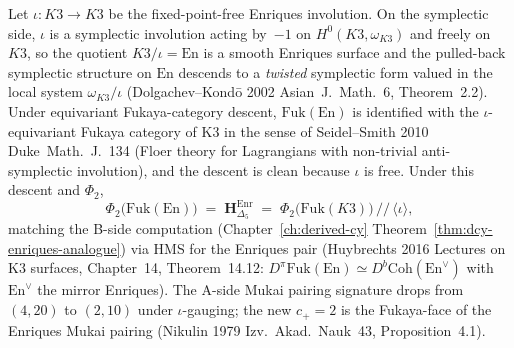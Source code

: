 \begin{remark}
\label{rem:fukaya-enriques}
Let $\iota\colon K3\to K3$ be the fixed-point-free Enriques
involution. On the symplectic side, $\iota$ is a symplectic
involution acting by~$-1$ on $H^0(K3,\omega_{K3})$ and freely on
$K3$, so the quotient $K3/\iota = \mathrm{En}$ is a smooth
Enriques surface and the pulled-back symplectic structure on
$\mathrm{En}$ descends to a \emph{twisted} symplectic form valued
in the local system $\omega_{K3}/\iota$ (Dolgachev--Kond\={o} 2002
\textup{Asian~J.~Math.}~6, Theorem~2.2). Under equivariant
Fukaya-category descent, $\mathrm{Fuk}(\mathrm{En})$ is identified
with the $\iota$-equivariant Fukaya category of K3 in the sense of
Seidel--Smith 2010
\textup{Duke~Math.~J.}~134 (Floer theory for Lagrangians with
non-trivial anti-symplectic involution), and the descent is clean
because $\iota$ is free. Under this descent and $\Phi_2$,
\[
 \Phi_2\bigl(\mathrm{Fuk}(\mathrm{En})\bigr)
 \;=\;
 \mathbf{H}_{\Delta_5}^{\mathrm{Enr}}
 \;=\;
 \Phi_2\bigl(\mathrm{Fuk}(K3)\bigr)\,/\!\!/\,\langle\iota\rangle,
\]
matching the B-side computation
(Chapter~\ref{ch:derived-cy}
Theorem~\ref{thm:dcy-enriques-analogue}) via HMS for the
Enriques pair (Huybrechts 2016 \textup{Lectures on K3 surfaces},
Chapter~14, Theorem~14.12: $D^\pi\mathrm{Fuk}(\mathrm{En})
\simeq D^b\mathrm{Coh}(\mathrm{En}^\vee)$ with
$\mathrm{En}^\vee$ the mirror Enriques). The A-side Mukai pairing
signature drops from $(4,20)$ to $(2,10)$ under $\iota$-gauging;
the new $c_+ = 2$ is the Fukaya-face of the Enriques Mukai pairing
(Nikulin 1979 \textup{Izv.~Akad.~Nauk}~43, Proposition~4.1).
\end{remark}

